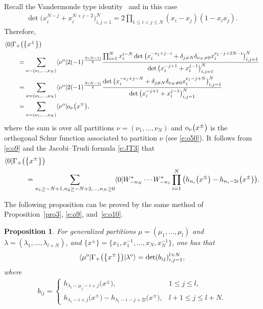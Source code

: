 \documentclass[pdftex]{sigma}
\numberwithin{equation}{section}
\newtheorem{Proposition}[Theorem]{Proposition}
 { \theoremstyle{definition}
\newtheorem{Definition}[Theorem]{Definition}
\newtheorem{Note}[Theorem]{Note}
\newtheorem{Example}[Theorem]{Example}
\newtheorem{Remark}[Theorem]{Remark} }
\begin{document}
Recall the Vandermonde type identity~\cite[formula~(4.4)]{JN2015} and \cite[p.~221]{Wey1946} in this case
\begin{align*}
\det\big(x^{N-j}_i+x^{N+j-2}_i\big)^N_{i,j=1}=2\prod_{1\leq i<j\leq N} (x_i-x_j)(1-x_ix_j).
\end{align*}
Therefore,
\begin{align}
\notag&\langle 0|\Gamma_+\big(\big\{x^{\pm}\big\}\big)\\
\notag&\qquad=\sum_{\nu=(\nu_1,\dots,\nu_N)}\langle\nu^{\rm o}|2(-1)^{\frac{N(N-1)}{2}}\frac{\prod^N_{i=1}x^{i-N}_i\det\big(x^{-\nu_j+j-i}_i+\delta_{j\neq N}\delta_{\nu_N\neq 0}x^{\nu_j-j+2N-i}_i\big)^N_{i,j=1}}{\det\big(x^{-j+1}_i+x^{j-1}_i\big)^N_{i,j=1}}\\
\notag&\qquad=\sum_{\nu=(\nu_1,\dots,\nu_N)}\langle\nu^{\rm o}|2(-1)^{\frac{N(N-1)}{2}}\frac{\det\big(x^{-\nu_j+j-N}_i+\delta_{j\neq N}\delta_{\nu_N\neq 0}x^{\nu_j-j+N}_i\big)^N_{i,j=1}}{\det\big(x^{-j+1}_i+x^{j-1}_i\big)^N_{i,j=1}}\\
\label{e:o11}&\qquad=\sum_{\nu=(\nu_1,\dots,\nu_N)}\langle\nu^{\rm o}|{\rm o}_\nu\big(x^{\pm}\big),
\end{align}
where the sum is over all partitions $\nu=(\nu_1,\dots,\nu_N)$ and ${\rm o}_\nu\big(x^{\pm}\big)$ is the orthogonal Schur function associated to partition $\nu$ (see \eqref{e:o50}). It follows from \eqref{e:o9} and the Jacobi--Trudi formula \eqref{e:JT3} that
\begin{align}
\notag&\langle 0|\Gamma_+\big(\big\{x^{\pm}\big\}\big)\\
&\quad\qquad{}=\sum_{n_1\geq -N+1,n_2\geq -N+2,\dots,n_N\geq 0}
\langle 0|W^*_{-n_N}\cdots W^*_{-n_1}\prod^N_{i=1}\big(h_{n_i}\big(x^{\pm}\big)-h_{n_i-2i}\big(x^{\pm}\big)\big).\label{e:o10}
\end{align}

The following proposition can be proved by the same method of Proposition~\ref{pro3}, \eqref{e:o9}, and~\eqref{e:o10}.
\begin{Proposition}%
For generalized partitions $\mu=(\mu_1,\dots,\mu_l)$ and $\lambda=(\lambda_1,\dots,\lambda_{l+N})$, and $\big\{x^{\pm}\big\}=\big\{x_1, x_1^{-1}, \ldots, x_N, x_N^{-1}\big\}$, one has that
\begin{align}
\label{e:sk5}\langle\mu^{\rm o}|\Gamma_+\big(\big\{x^{\pm}\big\}\big)|\lambda^{\rm o}\rangle = \det(b_{ij})^{l+N}_{i,j=1},
\end{align}
where
\begin{align*}
b_{ij}=\begin{cases}
h_{\lambda_i-\mu_j-i+j}\big(x^{\pm}\big), &1\leq j\leq l,\\
h_{\lambda_i-i+j}\big(x^{\pm}\big)-h_{\lambda_i-i-j+2l}\big(x^{\pm}\big), & l+1\leq j\leq l+N.
\end{cases}
\end{align*}
\end{Proposition}
\end{document}
